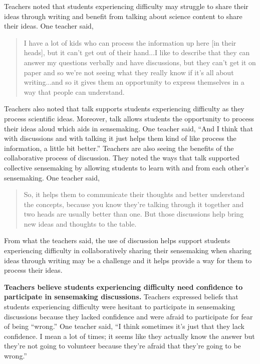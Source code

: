 \documentclass{sig-alternate} %
\begin{document}
\begin{large}
Teachers noted that students experiencing difficulty may struggle to share their ideas through writing and benefit from talking about science content to share their ideas. One teacher said, 

\begin{quote}
I have a lot of kids who can process the information up here [in their heads], but it 	can't get out of their hand...I like to describe that they can answer my questions 	verbally and have discussions, but they can't get it on paper and so we're not 	seeing what they really know if it's all about writing...and so it gives them an opportunity to express themselves in a way that people can understand. 
\end{quote}

Teachers also noted that talk supports students experiencing difficulty as they process scientific ideas. Moreover, talk allows students the opportunity to process their ideas aloud which aids in sensemaking. One teacher said, “And I think that with discussions and with talking it just helps them kind of like process the information, a little bit better.” Teachers are also seeing the benefits of the collaborative process of discussion. They noted the ways that talk supported collective sensemaking by allowing students to learn with and from each other's sensemaking. One teacher said, 

\begin{quote}
So, it helps them to communicate their thoughts and better understand the concepts, because you know they're talking through it together and two heads are usually better than one. But those discussions help bring new ideas and thoughts to the table. 
\end{quote}

From what the teachers said, the use of discussion helps support students experiencing difficulty in collaboratively sharing their sensemaking when sharing ideas through writing may be a challenge and it helps provide a way for them to process their ideas.

\textbf{Teachers believe students experiencing difficulty need confidence to participate in sensemaking discussions.} Teachers expressed beliefs that students experiencing difficulty were hesitant to participate in sensemaking discussions because they lacked confidence and were afraid to participate for fear of being “wrong.” One teacher said, “I think sometimes it's just that they lack confidence. I mean a lot of times; it seems like they actually know the answer but they're not going to volunteer because they're afraid that they're going to be wrong.” 


\end{large}
\end{document}
